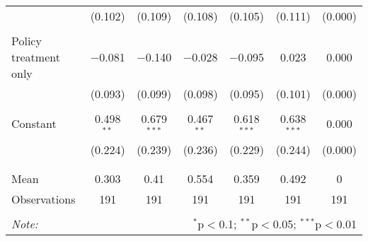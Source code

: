\begin{tabular}{@{\extracolsep{5pt}}lcccccc}
  & (0.102) & (0.109) & (0.108) & (0.105) & (0.111) & (0.000) \\ 
  & & & & & & \\ 
 Policy treatment only & $-$0.081 & $-$0.140 & $-$0.028 & $-$0.095 & 0.023 & 0.000 \\ 
  & (0.093) & (0.099) & (0.098) & (0.095) & (0.101) & (0.000) \\ 
  & & & & & & \\ 
 Constant & 0.498$^{**}$ & 0.679$^{***}$ & 0.467$^{**}$ & 0.618$^{***}$ & 0.638$^{***}$ & 0.000 \\ 
  & (0.224) & (0.239) & (0.236) & (0.229) & (0.244) & (0.000) \\ 
  & & & & & & \\ 
\hline \\[-1.8ex] 
Mean & 0.303 & 0.41 & 0.554 & 0.359 & 0.492 & 0 \\ 
Observations & 191 & 191 & 191 & 191 & 191 & 191 \\ 
\hline 
\hline \\[-1.8ex] 
\textit{Note:}  & \multicolumn{6}{r}{$^{*}$p$<$0.1; $^{**}$p$<$0.05; $^{***}$p$<$0.01} \\ 
\end{tabular} 
